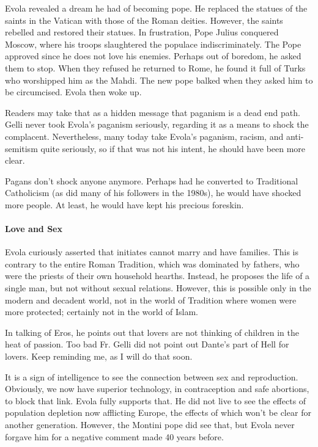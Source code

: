 Evola revealed a dream he had of becoming pope. He replaced the statues of the saints in the Vatican with those of the Roman deities. However, the saints rebelled and restored their statues. In frustration, Pope Julius conquered Moscow, where his troops slaughtered the populace indiscriminately. The Pope approved since he does not love his enemies. Perhaps out of boredom, he asked them to stop. When they refused he returned to Rome, he found it full of Turks who worshipped him as the Mahdi. The new pope balked when they asked him to be circumcised. Evola then woke up.

Readers may take that as a hidden message that paganism is a dead end path. Gelli never took Evola's paganism seriously, regarding it as a means to shock the complacent. Nevertheless, many today take Evola's paganism, racism, and anti-semitism quite seriously, so if that was not his intent, he should have been more clear.

Pagans don't shock anyone anymore. Perhaps had he converted to Traditional Catholicism (as did many of his followers in the 1980s), he would have shocked more people. At least, he would have kept his precious foreskin.

\paragraph{Love and Sex}


Evola curiously asserted that initiates cannot marry and have families. This is contrary to the entire Roman Tradition, which was dominated by fathers, who were the priests of their own household hearths. Instead, he proposes the life of a single man, but not without sexual relations. However, this is possible only in the modern and decadent world, not in the world of Tradition where women were more protected; certainly not in the world of Islam.

In talking of Eros, he points out that lovers are not thinking of children in the heat of passion. Too bad Fr. Gelli did not point out Dante's part of Hell for lovers. Keep reminding me, as I will do that soon.

It is a sign of intelligence to see the connection between sex and reproduction. Obviously, we now have superior technology, in contraception and safe abortions, to block that link. Evola fully supports that. He did not live to see the effects of population depletion now afflicting Europe, the effects of which won't be clear for another generation. However, the Montini pope did see that, but Evola never forgave him for a negative comment made 40 years before.

